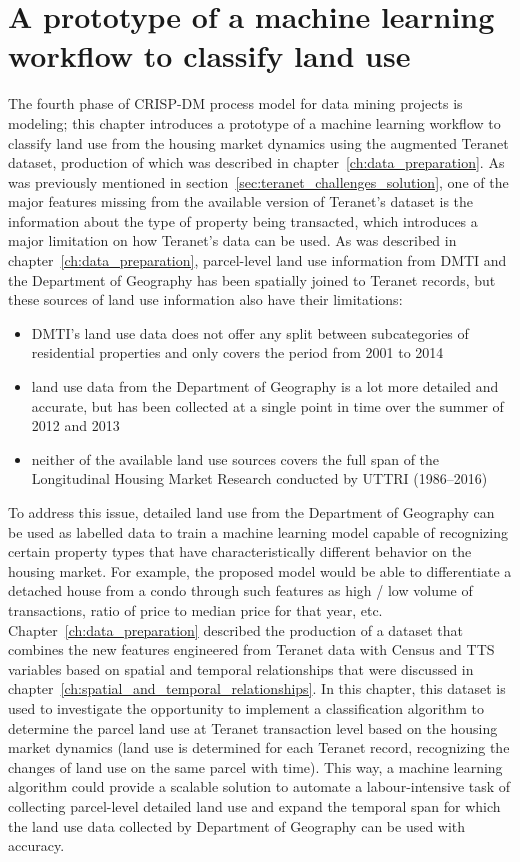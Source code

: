 \chapter{A prototype of a machine learning workflow to classify land use} \label{ch:ml_workflow}

The fourth phase of CRISP-DM process model for data mining projects is modeling;
this chapter introduces a prototype of a machine learning workflow to classify land use from the housing market dynamics using the augmented Teranet dataset, production of which was described in chapter~\ref{ch:data_preparation}.
As was previously mentioned in section~\ref{sec:teranet_challenges_solution}, one of the major features missing from the available version of Teranet's dataset is the information about the type of property being transacted, which introduces a major limitation on how Teranet's data can be used.
As was described in chapter~\ref{ch:data_preparation}, parcel-level land use information from DMTI and the Department of Geography has been spatially joined to Teranet records, but these sources of land use information also have their limitations:

\begin{itemize}
    \item DMTI's land use data does not offer any split between subcategories of residential properties and only covers the period from 2001 to 2014
    \item land use data from the Department of Geography is a lot more detailed and accurate, but has been collected at a single point in time over the summer of 2012 and 2013
    \item neither of the available land use sources covers the full span of the Longitudinal Housing Market Research conducted by UTTRI (1986--2016)
\end{itemize}

To address this issue, detailed land use from the Department of Geography can be used as labelled data to train a machine learning model capable of recognizing certain property types that have characteristically different behavior on the housing market.
For example, the proposed model would be able to differentiate a detached house from a condo through such features as high / low volume of transactions, ratio of price to median price for that year, etc.
Chapter~\ref{ch:data_preparation} described the production of a dataset that combines the new features engineered from Teranet data with Census and TTS variables based on spatial and temporal relationships that were discussed in chapter~\ref{ch:spatial_and_temporal_relationships}.
In this chapter, this dataset is used to investigate the opportunity to implement a classification algorithm to determine the parcel land use at Teranet transaction level based on the housing market dynamics (land use is determined for each Teranet record, recognizing the changes of land use on the same parcel with time).
This way, a machine learning algorithm could provide a scalable solution to automate a labour-intensive task of collecting parcel-level detailed land use and expand the temporal span for which the land use data collected by Department of Geography can be used with accuracy.

